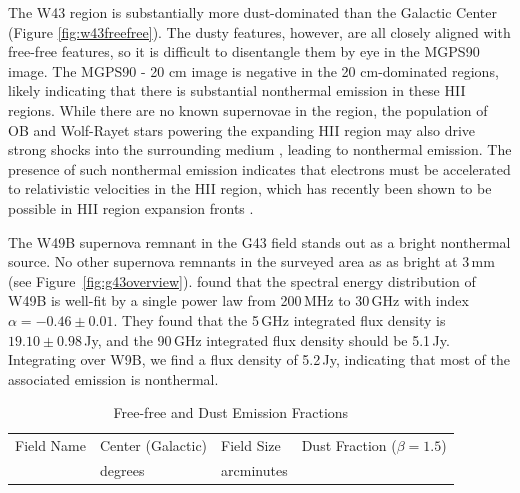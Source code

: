 \documentclass[twocolumn]{aastex62}
\begin{document}
The W43 region is substantially more dust-dominated than the Galactic Center
(Figure \ref{fig:w43freefree}).  The dusty features, however, are all closely
aligned with free-free features, so it is difficult to disentangle them by eye
in the MGPS90 image.  The MGPS90 - 20 cm image is negative in the 20
cm-dominated regions, likely indicating that there is substantial nonthermal
emission in these HII regions.  While there are no known supernovae in the region, the population
of OB and Wolf-Rayet stars powering the expanding HII region may also
drive strong shocks into the surrounding medium \citep[e.g.][]{Bally2010a}, leading to nonthermal emission.
The presence of such nonthermal emission indicates that electrons must be
accelerated to relativistic velocities in the HII region, which has recently
been shown to be possible in HII region expansion fronts
\citep{Padovani2019a}.

The W49B supernova remnant in the G43 field stands out as a bright nonthermal
source.  No other supernova remnants in the surveyed area as as bright at 3\,mm (see
Figure~\ref{fig:g43overview}). \citet{Sun2011a} found that the spectral energy
distribution of W49B is well-fit by a single power law from 200\,MHz to 30\,GHz
with index $\alpha=-0.46\pm0.01$.  They found that the 5\,GHz integrated flux density is
$19.10\pm0.98$\,Jy, and the 90\,GHz integrated flux density should be 5.1\,Jy.
Integrating over W9B, we find a flux density of 5.2\,Jy, indicating that most of
the associated emission is nonthermal. 

\begin{table}[htp]
\centering
\caption{Free-free and Dust Emission Fractions}
\begin{tabular}{llll}
    \label{tab:freefree}
Field Name   & Center (Galactic) & Field Size & Dust Fraction ($\beta=1.5$) \\
             & degrees           & arcminutes &                             \\
\hline
\hline

\hline
\hline
\end{tabular}
\end{table}
\end{document}
